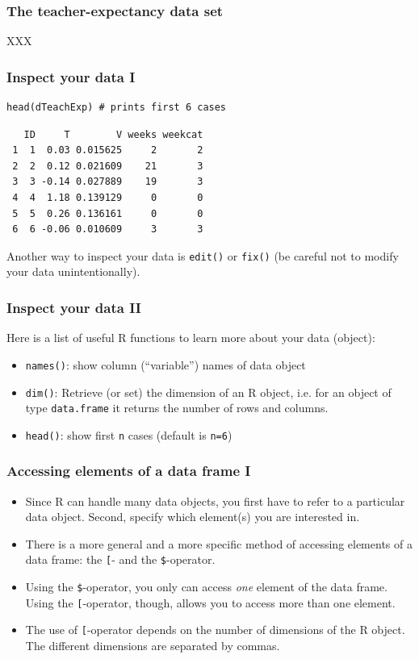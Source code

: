 \documentclass[bigger]{beamer}
\begin{document}
\begin{frame}
\frametitle{The teacher-expectancy data set}
\label{sec-3-1-3}

    XXX
\end{frame}
\begin{frame}[fragile]
\frametitle{Inspect your data I}
\label{sec-3-1-4}


\lstset{language=R}
\begin{lstlisting}
head(dTeachExp) # prints first 6 cases
\end{lstlisting}

\begin{verbatim}
   ID     T        V weeks weekcat
 1  1  0.03 0.015625     2       2
 2  2  0.12 0.021609    21       3
 3  3 -0.14 0.027889    19       3
 4  4  1.18 0.139129     0       0
 5  5  0.26 0.136161     0       0
 6  6 -0.06 0.010609     3       3
\end{verbatim}


    Another way to inspect your data is \texttt{edit()} or \texttt{fix()} (be careful not to
    modify your data unintentionally). 
\end{frame}
\begin{frame}
\frametitle{Inspect your data II}
\label{sec-3-1-5}

    Here is a list of useful R functions to learn more about your data (object):
\begin{itemize}
\item \texttt{names()}: show column (\enquote{variable}) names of data object
\item \texttt{dim()}: Retrieve (or set) the dimension of an R object, i.e. for an
      object of type \texttt{data.frame} it returns the number of rows and columns.
\item \texttt{head()}: show first \texttt{n} cases (default is \texttt{n=6})
\end{itemize}
\end{frame}
\begin{frame}
\frametitle{Accessing elements of a data frame I}
\label{sec-3-1-6}

\begin{itemize}
\item Since R can handle many data objects, you first have to refer to a
      particular data object. Second, specify which element(s) you are interested
      in.
\item There is a more general and a more specific method of accessing elements
      of a data frame: the \texttt{[}- and the \texttt{\$}-operator.
\item Using the \texttt{\$}-operator, you only can access \emph{one} element of the data
      frame. Using the \texttt{[}-operator, though, allows you to access more than one
      element.
\item The use of \texttt{[}-operator depends on the number of dimensions of the R
      object. The different dimensions are separated by commas.
\end{itemize}
\end{frame}
\end{document}
